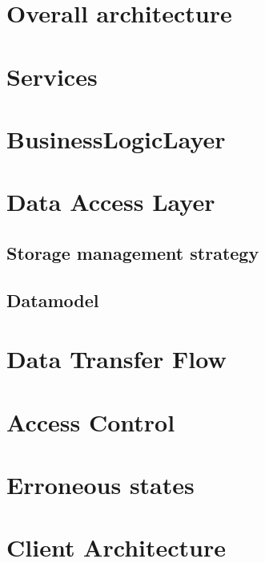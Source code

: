 \documentclass{report}
\begin{document}
\section{Overall architecture}


\section{Services}


\section{BusinessLogicLayer}


\section{Data Access Layer}
\subsection{Storage management strategy}

\subsection{Datamodel}




\section{Data Transfer Flow}


% 

\section{Access Control}


\section{Erroneous states}




\section{Client Architecture}

\end{document}
